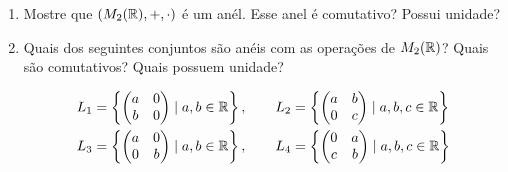 \documentclass[12pt]{exam}
\begin{document}
    \begin{enumerate}[label=({\alph*})]
        \item Mostre que $(M_2(\mathbb{R}), + , \cdot)$ \'e um an\'el. Esse anel \'e comutativo? Possui unidade?
        \item Quais dos seguintes conjuntos s\~ao an\'eis com as opera\c{c}\~oes de $M_2(\mathbb{R})$? Quais s\~ao comutativos? Quais possuem unidade?

        \begin{align*}
            L_1 &= \left\{\begin{pmatrix}
                a & 0\\
                b & 0
            \end{pmatrix} \mid a, b \in \mathbb{R}\right\},\qquad
            L_2 = \left\{\begin{pmatrix}
                a & b\\
                0 & c
            \end{pmatrix} \mid a, b, c \in \mathbb{R}\right\}\\
            L_3 &= \left\{\begin{pmatrix}
                a & 0\\
                0 & b
            \end{pmatrix} \mid a, b \in \mathbb{R}\right\},\qquad
            L_4 = \left\{\begin{pmatrix}
                0 & a\\
                c & b
            \end{pmatrix} \mid a, b, c \in \mathbb{R}\right\}
        \end{align*}
    \end{enumerate}

    \vspace{.3cm}
\end{document}
